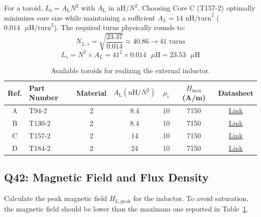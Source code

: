 \documentclass{PELsmallreport}
\begin{document}
\begin{framed}
	\vspace{2em}
	For a toroid, $L_{\mathrm{s}}= A_{\mathrm{L}}N^2$ with $A_{\mathrm{L}}$ in $\mathrm{nH}/N^2$. Choosing Core C (T157-2) optimally minimizes core size while maintaining a sufficient $A_L = 14\text{ nH/turn}^2$ ($0.014\text{ }\mu\text{H/turn}^2$). The required turns physically rounds to:
\[ N_{L,s} = \sqrt{\frac{23.37}{0.014}} \approx 40.86 \rightarrow 41\text{ turns} \]
\[ L_s = N^2 \times A_L = 41^2 \times 0.014\text{ }\mu\text{H} = 23.53\text{ }\mu\text{H} \]

	\vspace{2em}
\end{framed}

 \qquad {} \qquad {} \hfill{}

\begin{table}[!h]
\centering
\caption{Available toroids for realizing the external inductor. }
\label{tab:toroids}
\begin{tabular}{clccccc}
	\toprule
	Ref. & Part Number  & Material & $A_\mathrm{L} \left(\mathrm{nH}/N^2\right)$   & $\mu_\mathrm{r}$ & $H_\mathrm{max}$ (A/m) & Datasheet           \\
	\toprule
    A & T94-2      & 2   & 8.4   & 10    & 7150  & \href{https://www.rf-microwave.com/resources/products_attachments/6128f4a31a84b.pdf}{Link}\\
    B & T130-2      & 2 & 8.4   & 10    & 7150  & \href{https://www.rf-microwave.com/resources/products_attachments/6128f4a31a84b.pdf}{Link}\\
    C & T157-2      & 2  & 14    & 10    & 7150  &  \href{https://datasheets.micrometals.com/T157-2-DataSheet.pdf}{Link}\\
    D & T184-2      & 2  & 24    & 10    & 7150  &  \href{https://datasheets.micrometals.com/T184-2-DataSheet.pdf}{Link}\\
	\bottomrule
\end{tabular}
\end{table}


\subsection{Q42: Magnetic Field and Flux Density}
Calculate the peak magnetic field $H_{\mathrm{L,peak}}$ for the inductor. 
To avoid saturation, the magnetic field should be lower than the maximum one reported in Table~\ref{tab:toroids}. 
\end{document}

